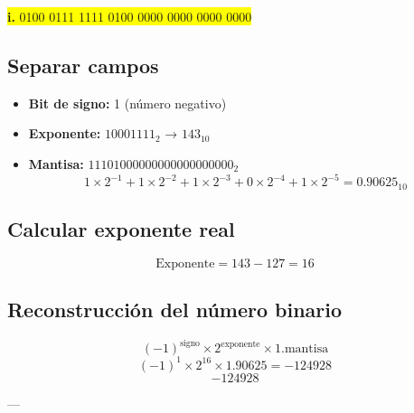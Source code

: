 \documentclass[a4paper,12pt]{article}
\begin{document}
	\begin{center}
		\colorbox{yellow}{\textbf{i.} 0100 0111 1111 0100 0000 0000 0000 0000}
		
		\subsection*{Separar campos}
		
		\begin{itemize}
			\item \textbf{Bit de signo:} 1 (número negativo)
			\item \textbf{Exponente:} $10001111_2$ → $143_{10}$
			\item \textbf{Mantisa:} $11101000000000000000000_2$ 
			\[
			1\times2^{-1} + 1\times2^{-2} + 1\times2^{-3} + 0\times2^{-4} + 1\times2^{-5} = 0.90625_{10}
			\]
		\end{itemize}
		
		\subsection*{Calcular exponente real}
		
		\[
		\text{Exponente} = 143 - 127 = 16
		\]
		
		
		
		\subsection*{Reconstrucción del número binario}	
		\[
		(-1)^{\text{signo}} \times 2^{\text{exponente}} \times 1.\text{mantisa}
		\]
		\[
		(-1)^1 \times 2^16 \times 1.90625 = -124928
		\]
		\vspace{1em}
		\[
		\boxed{-124928}
		\]
		
		---
	\end{center}
	
\end{document}
